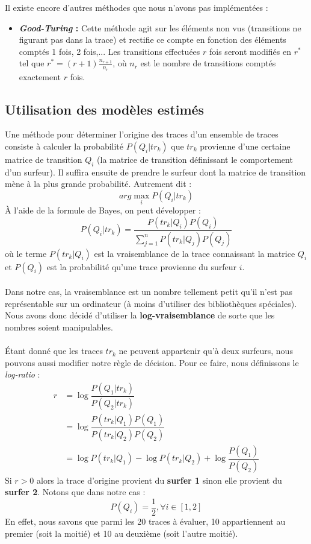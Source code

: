 \documentclass[a4paper,titlepage]{report}
\begin{document}
Il existe encore d'autres méthodes que nous n'avons pas implémentées : \\
\begin{itemize}
	\item \textbf{\textit{Good-Turing} : } Cette méthode agit sur les éléments non vus (transitions ne figurant pas dans la trace) et rectifie ce compte en fonction des éléments comptés 1 fois, 2 fois,... Les transitions effectuées $r$ fois seront modifiés en $r^*$ tel que $r^* = (r+1) \frac{n_{r+1}}{n_r}$, où $n_r$ est le nombre de transitions comptés exactement $r$ fois.
\end{itemize}

\subsection{Utilisation des modèles estimés}
\label{ssec:util_esti}
Une méthode pour déterminer l'origine des traces d'un ensemble de traces consiste à calculer la probabilité $P(Q_i|tr_k)$ que $tr_k$ provienne d'une certaine matrice de transition $Q_i$ (la matrice de transition définissant le comportement d'un surfeur). Il suffira ensuite de prendre le surfeur dont la matrice de transition mène à la plus grande probabilité. Autrement dit : 
\[
arg \max\limits_i P(Q_i|tr_k)
\]
À l'aide de la formule de Bayes, on peut développer : 
\[
P(Q_i|tr_k) = \dfrac{P(tr_k|Q_i) P(Q_i)}{\sum\limits_{j = 1}^n P(tr_k|Q_j) P(Q_j)}
\]
où le terme $P(tr_k|Q_i)$ est la vraisemblance de la trace connaissant la matrice $Q_i$ et $P(Q_i)$ est la probabilité qu'une trace provienne du surfeur $i$.
\paragraph{}
Dans notre cas, la vraisemblance est un nombre tellement petit qu'il n'est pas représentable sur un ordinateur (à moins d'utiliser des bibliothèques spéciales). Nous avons donc décidé d'utiliser la \textbf{log-vraisemblance} de sorte que les nombres soient manipulables. 
\paragraph{} 
Étant donné que les traces $tr_k$ ne peuvent appartenir qu'à deux surfeurs, nous pouvons aussi modifier notre règle de décision. Pour ce faire, nous définissons le \textit{log-ratio} :
\[
\begin{aligned}
r &= \log \dfrac{P(Q_1|tr_k)}{P(Q_2|tr_k)}\\
&= \log \dfrac{P(tr_k|Q_1) P(Q_1)}{P(tr_k|Q_2) P(Q_2)}\\
&= \log P(tr_k|Q_1) - \log P(tr_k|Q_2) + \log \dfrac{P(Q_1)}{P(Q_2)}
\end{aligned}
\]
Si $r > 0$ alors la trace d'origine provient du \textbf{surfer 1} sinon elle provient du \textbf{surfer 2}. Notons que dans notre cas :
\[ 
	P(Q_i) = \frac{1}{2}, \forall i \in [1,2]
\]
En effet, nous savons que parmi les 20 traces à évaluer, 10 appartiennent au premier (soit la moitié) et 10 au deuxième (soit l'autre moitié).  
\end{document}
